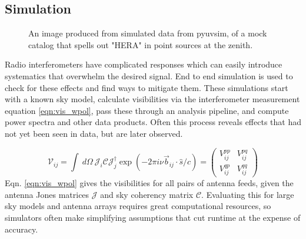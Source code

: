 \documentclass[a0,landscape]{a0poster}
\begin{document}
\begin{multicols}{4}
\columnbreak
\subsection*{Simulation}

\begin{figure}[H]
\centering
\vspace*{-20pt}
\caption{An image produced from simulated data from pyuvsim, of a mock catalog that spells out "HERA" in point sources at the zenith.}
\vspace*{-15pt}
\label{fig:heratext}
\end{figure}

Radio interferometers have complicated responses which can easily introduce systematics that overwhelm the desired signal. End to end simulation is used to check for these effects and find ways to mitigate them. These simulations start with a known sky model, calculate visibilities via the interferometer measurement equation \eqref{eqn:vis_wpol}, pass these through an analysis pipeline, and compute power spectra and other data products. Often this process reveals effects that had not yet been seen in data, but are later observed.

\begin{equation}
\mathcal{V}_{ij} = \int\: d\Omega\: \mathcal{J}_i \mathcal{C} \mathcal{J}_j^\dag \exp( - 2\pi i \nu \vec{b}_{ij} \cdot \hat{s} / c)
= \left( \begin{matrix}
V^{pp}_{ij} & V^{pq}_{ij} \\
V^{qp}_{ij} & V^{qq}_{ij}
\end{matrix} \right)
\label{eqn:vis_wpol}
\end{equation}
Eqn. \eqref{eqn:vis_wpol} gives the visibilities for all pairs of antenna feeds, given the antenna Jones matrices $\mathcal{J}$ and sky coherency matrix $\mathcal{C}$. Evaluating this for large sky models and antenna arrays requires great computational resources, so simulators often make simplifying assumptions that cut runtime at the expense of accuracy.


\end{multicols}
\end{document}
